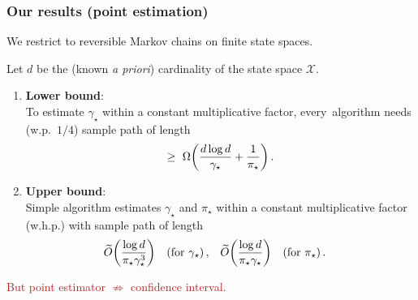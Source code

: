 \documentclass[11pt,compress,blue4,notheorems]{beamer}
\newcommand{\GREEN}[1]{\textcolor{boldgreen}{#1}}
\newcommand{\FIREBRICK}[1]{\textcolor{firebrick}{#1}}
\newcommand\fns\footnotesize
\newcommand\pimin{\ensuremath{\pi_{\star}}}
\newcommand\gap{\ensuremath{\gamma_{\star}}}
\newcommand\states{\ensuremath{\mathcal{X}}}
\begin{document}

\begin{frame}
  \frametitle{Our results (point estimation)}

  We restrict to \GREEN{reversible Markov chains} on \GREEN{finite
  state spaces}.

  Let $d$ be the (known \emph{a priori}) cardinality of the state
  space $\states$.

  \begin{enumerate}
    \item<2->
      {\fns\textbf{Lower bound}:} \\
      To estimate $\gap$ within a constant multiplicative factor,
      \mbox{every algorithm} needs (w.p.~$1/4$) sample path of
      length
      \[
        \geq \
        \Omega\Parens{
          \frac{d \log d}{\gap} + \frac1{\pimin}
        }
        \,.
      \]

    \item<3->
      {\fns\textbf{Upper bound}:} \\
      Simple algorithm estimates $\gap$ and $\pimin$ within a constant
      multiplicative factor (w.h.p.) with sample path of length
      \begin{align*}
        \wt O\Parens{ \frac{\log d}{\pimin\gap^3} }
        & \quad
        \text{(for $\gap$)}
        \,,
        &
        \wt O\Parens{ \frac{\log d}{\pimin\gap} }
        & \quad
        \text{(for $\pimin$)}
        \,.
      \end{align*}

  \end{enumerate}

  \begin{center}
    \FIREBRICK{%
      But point estimator $\not\Rightarrow$
      confidence interval.
    }
  \end{center}

\end{frame}

\end{document}
